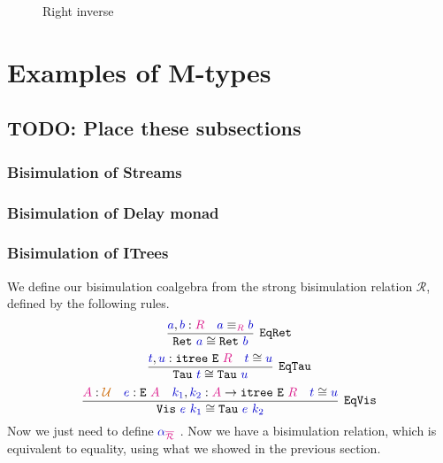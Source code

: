 \documentclass[twoside,11pt,openright]{report}
\newcommand*{\term}[1]{\textcolor{blue!80!black}{#1}}
\newcommand*{\type}[1]{\textcolor{magenta!90!black}{#1}}
\newcommand*{\universe}[1]{\textcolor{orange!80!black}{#1}}
\newcommand*{\function}[1]{\textcolor{blue!60!black}{\ensuremath{\mathtt{#1}}}}
\newcommand*{\typeformer}[1]{\ensuremath{\mathtt{#1}}}
\begin{document}
\begin{figure}[h]
  \centering
  \caption{Right inverse}
  \label{fig:contractive}
\end{figure}



\chapter{Examples of M-types}
\section{TODO: Place these subsections}
\subsection{Bisimulation of Streams}
\subsection{Bisimulation of Delay monad}
\subsection{Bisimulation of ITrees}
We define our bisimulation coalgebra from the strong bisimulation relation \(\mathcal{R}\), defined by the following rules.
\begin{equation}
  \infer[\mathtt{EqRet}]{\mathtt{Ret}~\term{a} \cong \mathtt{Ret}~\term{b}}{\term{a},\term{b} : \type{R} & \term{a} \equiv_{\type{R}} \term{b}}
\end{equation}
\begin{equation}
  \infer[\mathtt{EqTau}]{\mathtt{Tau}~\term{t} \cong \mathtt{Tau}~\term{u}}{\term{t},\term{u} : \mathtt{itree}~\typeformer{E}~\type{R} & \term{t} \cong \term{u}}
\end{equation}
\begin{equation}
  \infer[\mathtt{EqVis}]{\mathtt{Vis}~\term{e}~\term{k_1} \cong \mathtt{Tau}~\term{e}~\term{k_2}}{\type{A} : \universe{\mathcal{U}} & \term{e} : \typeformer{E}~\type{A} & \term{k_1},\term{k_2} : \type{A} \rightarrow \mathtt{itree}~\typeformer{E}~\type{R} & \term{t} \cong \term{u}}
\end{equation}
Now we just need to define \(\term{\alpha}_{\type{\overline{\mathcal{R}}}}\) . Now we have a bisimulation relation, which is equivalent to equality, using what we showed in the previous section.
\end{document}
